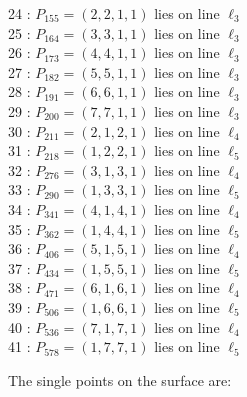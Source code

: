 \documentclass{article}
\begin{document}
{\begin{multicols}{2}
24 : $P_{155}=( 2, 2, 1, 1 )$ lies on line $\ell_{3}$\\
25 : $P_{164}=( 3, 3, 1, 1 )$ lies on line $\ell_{3}$\\
26 : $P_{173}=( 4, 4, 1, 1 )$ lies on line $\ell_{3}$\\
27 : $P_{182}=( 5, 5, 1, 1 )$ lies on line $\ell_{3}$\\
28 : $P_{191}=( 6, 6, 1, 1 )$ lies on line $\ell_{3}$\\
29 : $P_{200}=( 7, 7, 1, 1 )$ lies on line $\ell_{3}$\\
30 : $P_{211}=( 2, 1, 2, 1 )$ lies on line $\ell_{4}$\\
31 : $P_{218}=( 1, 2, 2, 1 )$ lies on line $\ell_{5}$\\
32 : $P_{276}=( 3, 1, 3, 1 )$ lies on line $\ell_{4}$\\
33 : $P_{290}=( 1, 3, 3, 1 )$ lies on line $\ell_{5}$\\
34 : $P_{341}=( 4, 1, 4, 1 )$ lies on line $\ell_{4}$\\
35 : $P_{362}=( 1, 4, 4, 1 )$ lies on line $\ell_{5}$\\
36 : $P_{406}=( 5, 1, 5, 1 )$ lies on line $\ell_{4}$\\
37 : $P_{434}=( 1, 5, 5, 1 )$ lies on line $\ell_{5}$\\
38 : $P_{471}=( 6, 1, 6, 1 )$ lies on line $\ell_{4}$\\
39 : $P_{506}=( 1, 6, 6, 1 )$ lies on line $\ell_{5}$\\
40 : $P_{536}=( 7, 1, 7, 1 )$ lies on line $\ell_{4}$\\
41 : $P_{578}=( 1, 7, 7, 1 )$ lies on line $\ell_{5}$\\
\end{multicols}
The single points on the surface are:\\
}
\end{document}
